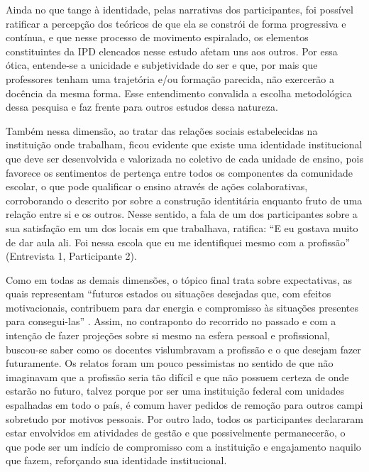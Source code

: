 \documentclass[portuguese]{textolivre}
\begin{document}
 Ainda no que tange à identidade, pelas narrativas dos participantes, foi possível ratificar a percepção dos teóricos \textcite{dubar2005,bauman2021} de que ela se constrói de forma progressiva e contínua, e que nesse processo de movimento espiralado, os elementos constituintes da IPD elencados nesse estudo afetam uns aos outros. Por essa ótica, entende-se a unicidade e subjetividade do ser e que, por mais que professores tenham uma trajetória e/ou formação parecida, não exercerão a docência da mesma forma. Esse entendimento convalida a escolha metodológica dessa pesquisa e faz frente para outros estudos dessa natureza.
 
Também nessa dimensão, ao tratar das relações sociais estabelecidas na instituição onde trabalham, ficou evidente que existe uma identidade institucional que deve ser desenvolvida e valorizada no coletivo de cada unidade de ensino, pois favorece os sentimentos de pertença entre todos os componentes da comunidade escolar, o que pode qualificar o ensino através de ações colaborativas, corroborando o descrito por \textcite{bolivar2006} sobre a construção identitária enquanto fruto de uma relação entre si e os outros. Nesse sentido, a fala de um dos participantes sobre a sua satisfação em um dos locais em que trabalhava, ratifica: “E eu gostava muito de dar aula ali. Foi nessa escola que eu me identifiquei mesmo com a profissão” (Entrevista 1, Participante 2).

Como em todas as demais dimensões, o tópico final trata sobre expectativas, as quais representam “futuros estados ou situações desejadas que, com efeitos motivacionais, contribuem para dar energia e compromisso às situações presentes para consegui-las” \cite[p.~169]{bolivar1998}. Assim, no contraponto do recorrido no passado e com a intenção de fazer projeções sobre si mesmo na esfera pessoal e profissional, buscou-se saber como os docentes vislumbravam a profissão e o que desejam fazer futuramente. Os relatos foram um pouco pessimistas no sentido de que não imaginavam que a profissão seria tão difícil e que não possuem certeza de onde estarão no futuro, talvez porque por ser uma instituição federal com unidades espalhadas em todo o país, é comum haver pedidos de remoção para outros campi sobretudo por motivos pessoais. Por outro lado, todos os participantes declararam estar envolvidos em atividades de gestão e que possivelmente permanecerão, o que pode ser um indício de compromisso com a instituição e engajamento naquilo que fazem, reforçando sua identidade institucional.
\end{document}
